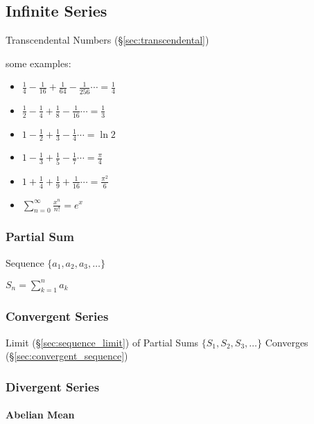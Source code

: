 \subsection{Infinite Series}\label{sec:infinite_series}

Transcendental Numbers (\S\ref{sec:transcendental})

some examples:
\begin{itemize}
  \item $\frac{1}{4} - \frac{1}{16} + \frac{1}{64} - \frac{1}{256} \cdots
    = \frac{1}{4}$
  \item $\frac{1}{2} - \frac{1}{4} + \frac{1}{8} - \frac{1}{16} \cdots
    = \frac{1}{3}$
  \item $1 - \frac{1}{2} + \frac{1}{3} - \frac{1}{4} \cdots  = \ln{2}$
  \item $1 - \frac{1}{3} + \frac{1}{5} - \frac{1}{7} \cdots  = \frac{\pi}{4}$
  \item $1 + \frac{1}{4} + \frac{1}{9} + \frac{1}{16} \cdots = \frac{\pi^2}{6}$
  \item $\sum_{n=0}^\infty \frac{x^n}{n!} = e^x$
\end{itemize}



\subsubsection{Partial Sum}\label{sec:partial_sum}

Sequence $\{ a_1, a_2, a_3, \ldots \}$

$S_n = \sum_{k=1}^n a_k$



\subsubsection{Convergent Series}\label{sec:convergent_series}

Limit (\S\ref{sec:sequence_limit}) of Partial Sums $\{ S_1, S_2, S_3,
\ldots \}$ Converges (\S\ref{sec:convergent_sequence})



\subsubsection{Divergent Series}\label{sec:divergent_series}

\paragraph{Abelian Mean}\label{sec:abelian_mean}\hfill

